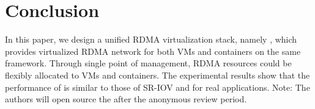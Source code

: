 \section{Conclusion} \label{conclusion}

In this paper, we design a unified RDMA virtualization stack, namely \sys, which provides virtualized RDMA network for both VMs and containers on the same framework.
Through single point of management, RDMA resources could be flexibly allocated to VMs and containers. %
The experimental results show that the performance of \sys is similar to those of SR-IOV and \native for real applications.
Note: The authors will open source the \sys after the anonymous review period.

